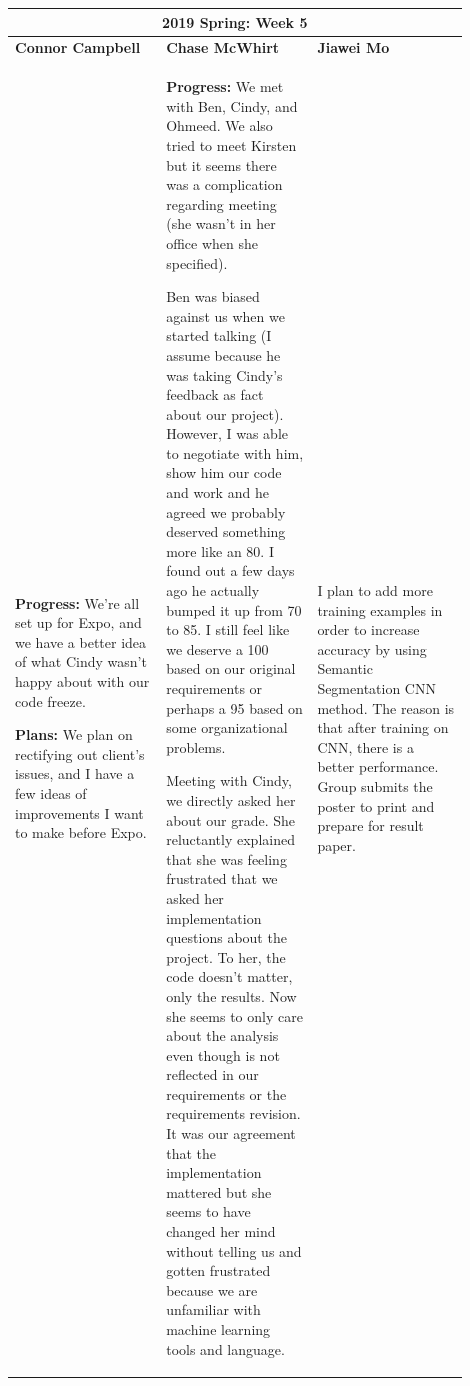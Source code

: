 \documentclass[10pt,journal,compsoc, draftclsnofoot,onecolumn]{IEEEtran}
\begin{document}
\begin{center}
\begin{tabular}{|p{0.3\linewidth}|p{0.3\linewidth}|p{0.3\linewidth}|}
\hline
\multicolumn{3}{|c|}{\textbf{2019 Spring: Week 5}} \\
\hline
\textbf{Connor Campbell} & \textbf{Chase McWhirt} & \textbf{Jiawei Mo} \\ [0.5ex]
\hline\hline

\textbf{Progress:} We're all set up for Expo, and we have a better idea of what Cindy wasn't happy about with our code freeze.

\textbf{Plans:} We plan on rectifying out client's issues, and I have a few ideas of improvements I want to make before Expo.
&
\textbf{Progress:} We met with Ben, Cindy, and Ohmeed.
We also tried to meet Kirsten but it seems there was a complication regarding meeting (she wasn't in her office when she specified).

Ben was biased against us when we started talking (I assume because he was taking Cindy's feedback as fact about our project).
However, I was able to negotiate with him, show him our code and work and he agreed we probably deserved something more like an 80.
I found out a few days ago he actually bumped it up from 70 to 85.
I still feel like we deserve a 100 based on our original requirements or perhaps a 95 based on some organizational problems.

Meeting with Cindy, we directly asked her about our grade.
She reluctantly explained that she was feeling frustrated that we asked her implementation questions about the project.
To her, the code doesn't matter, only the results.
Now she seems to only care about the analysis even though is not reflected in our requirements or the requirements revision.
It was our agreement that the implementation mattered but she seems to have changed her mind without telling us and gotten frustrated because we are unfamiliar with machine learning tools and language.
&
I plan to add more training examples in order to increase accuracy by using Semantic Segmentation CNN method. The reason is that after training on CNN, there is a better performance. Group submits the poster to print and prepare for result paper.
\\ \hline
\end{tabular}
\end{center}
\end{document}

